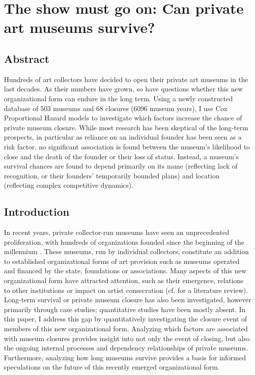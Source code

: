 \documentclass[12pt]{article}
\author{Johannes Aengenheyster}
\date{\today}
\title{}
\begin{document}
\section*{The show must go on: Can private art museums survive?}

\subsection*{Abstract}


Hundreds of art collectors have decided to open their private art museums in the last decades.
As their numbers have grown, so have questions whether this new organizational form can endure in the long term.
Using a newly constructed database of 503 museums and 68 closures (6096 museum years), I use Cox Proportional Hazard models to investigate which factors increase the chance of private museum closure.
While most research has been skeptical of the long-term prospects, in particular as reliance on an individual founder has been seen as a risk factor, no significant association is found between the museum's likelihood to close and the death of the founder or their loss of status.
Instead, a museum's survival chances are found to depend primarily on its name (reflecting lack of recognition, or their founders' temporarily bounded plans) and location (reflecting complex competitive dynamics).
\subsection*{Introduction}


In recent years, private collector-run museums have seen an unprecedented proliferation, with hundreds of organizations founded since the beginning of the millennium \parencite{Velthuis_etal_2023_boom,LarrysList_2015_report}.
These museums, run by individual collectors, constitute an addition to established organizational forms of art provision such as museums operated and financed by the state, foundations or associations.
Many aspects of this new organizational form have attracted attention, such as their emergence, relations to other institutions or impact on artist consecration (cf. \textcite{Kolbe_etal_2022_privatemuseum} for a literature review).
Long-term survival or private museum closure has also been investigated, however primarily through case studies; quantitative studies have been mostly absent.
In this paper, I address this gap by quantitatively investigating the closure event of members of this new organizational form.
Analyzing which factors are associated with museum closures provides insight into not only the event of closing, but also the ongoing internal processes and dependency relationships of private museums.
Furthermore, analyzing how long museums survive provides a basis for informed speculations on the future of this recently emerged organizational form. 
\end{document}
